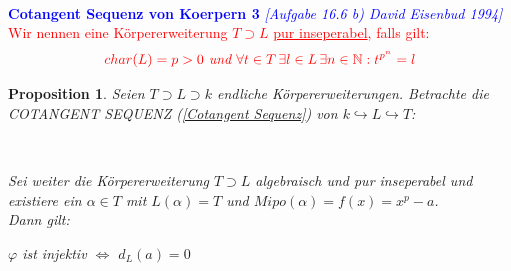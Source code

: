 \documentclass[10pt,a4paper]{report}
\newcommand{\ModulsOfDifferenzials}{David Eisenbud 1994}
\newcounter{Aussage}[chapter]
\newtheorem{prop}[Aussage]{Proposition}
\newcommand{\divR}[2]{\Omega_{#1/#2}}
\newcommand{\divf}[1]{d_{#1}}
\newcommand{\Tensor}[3]{#1 \otimes_{#2} #3}
\begin{document}
\ \\
\textcolor{blue}{\textbf{Cotangent Sequenz von Koerpern 3} \textit{[Aufgabe 16.6 b) \ModulsOfDifferenzials]}}
\textcolor{red}{Wir nennen eine Körpererweiterung $T \supset L$ \underline{pur inseperabel}, falls gilt:}
\begin{gather*}
\textcolor{red}{ char(L) = p > 0 \textit{ und } \forall t \in T \, \exists l \in  L \, \exists n \in \mathbb{N} : t^{p^n} = l }
\end{gather*}
\begin{prop}\label{Cotangent Sequenz von Koerpern 3}
Seien $T \supset L \supset k$ endliche Körpererweiterungen. Betrachte die COTANGENT SEQUENZ \textit{(\cref{Cotangent Sequenz})} von $k \hookrightarrow L \hookrightarrow T$:
\begin{center}
\ \\
\end{center}
Sei weiter die Körpererweiterung $T \supset L$ algebraisch und pur inseperabel und existiere ein $\alpha \in T$ mit $L(\alpha) = T$ und $Mipo(\alpha) = f(x) = x^p - a$.\\
Dann gilt:
\begin{center}
$\varphi$ ist injektiv $\Leftrightarrow$ $\divf{L}(a) = 0$
\end{center}
\end{prop}
\end{document}
